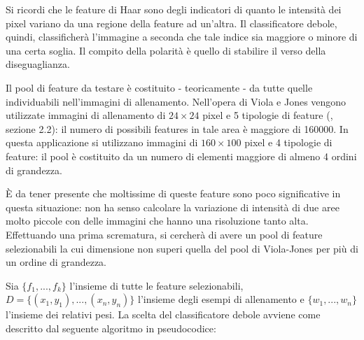         Si ricordi che le feature di Haar sono degli indicatori di quanto le intensità dei pixel variano da una regione della feature ad un'altra. Il classificatore debole, quindi, classificherà l'immagine a seconda che tale indice sia maggiore o minore di una certa soglia. Il compito della polarità è quello di stabilire il verso della diseguaglianza.

        Il pool di feature da testare è costituito - teoricamente - da tutte quelle individuabili nell'immagini di allenamento. Nell'opera di Viola e Jones vengono utilizzate immagini di allenamento di $24 \times 24$ pixel e 5 tipologie di feature (\cite{ViolaJones}, sezione 2.2): il numero di possibili features in tale area è maggiore di 160000. In questa applicazione si utilizzano immagini di $160 \times 100$ pixel e 4 tipologie di feature: il pool è costituito da un numero di elementi maggiore di almeno 4 ordini di grandezza.

        È da tener presente che moltissime di queste feature sono poco significative in questa situazione: non ha senso calcolare la variazione di intensità di due aree molto piccole con delle immagini che hanno una risoluzione tanto alta. Effettuando una prima scrematura, si cercherà di avere un pool di feature selezionabili la cui dimensione non superi quella del pool di Viola-Jones per più di un ordine di grandezza.

        Sia $\{ f_1,...,f_k\}$ l'insieme di tutte le feature selezionabili, $D = \{(x_1,y_1), ..., (x_n, y_n) \}$ l'insieme degli esempi di allenamento e $\{w_1, ..., w_n\}$ l'insieme dei relativi pesi. La scelta del classificatore debole avviene come descritto dal seguente algoritmo in pseudocodice:

